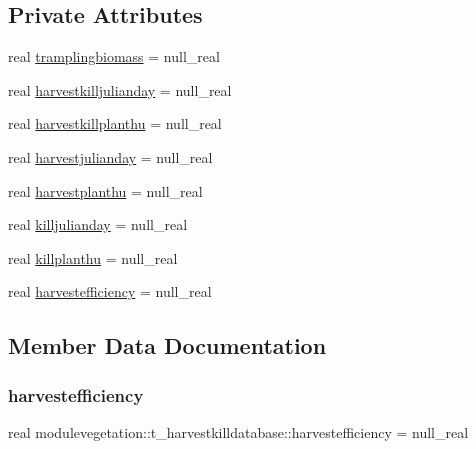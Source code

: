 \subsection*{Private Attributes}
\begin{DoxyCompactItemize}
\item 
real \mbox{\hyperlink{structmodulevegetation_1_1t__harvestkilldatabase_a9d1b143bd382f914e16085cb9b2c71a0}{tramplingbiomass}} = null\+\_\+real
\item 
real \mbox{\hyperlink{structmodulevegetation_1_1t__harvestkilldatabase_a53435b5ee72ab25499a4ff2b848b3c24}{harvestkilljulianday}} = null\+\_\+real
\item 
real \mbox{\hyperlink{structmodulevegetation_1_1t__harvestkilldatabase_acd6c508370d75e880af50c854e3a6689}{harvestkillplanthu}} = null\+\_\+real
\item 
real \mbox{\hyperlink{structmodulevegetation_1_1t__harvestkilldatabase_a51dd3243ff8f6e8a0f55bc804a05880c}{harvestjulianday}} = null\+\_\+real
\item 
real \mbox{\hyperlink{structmodulevegetation_1_1t__harvestkilldatabase_a0bdf28134107ac7d5887994ca64e4b3e}{harvestplanthu}} = null\+\_\+real
\item 
real \mbox{\hyperlink{structmodulevegetation_1_1t__harvestkilldatabase_a66f44948fd9ed832c18b597161de24d4}{killjulianday}} = null\+\_\+real
\item 
real \mbox{\hyperlink{structmodulevegetation_1_1t__harvestkilldatabase_ad4cd8e57dc60af57c3b5218e15d30a9d}{killplanthu}} = null\+\_\+real
\item 
real \mbox{\hyperlink{structmodulevegetation_1_1t__harvestkilldatabase_aa739c21df421022c892cf13586f0ecc8}{harvestefficiency}} = null\+\_\+real
\end{DoxyCompactItemize}


\subsection{Member Data Documentation}
\mbox{\label{structmodulevegetation_1_1t__harvestkilldatabase_aa739c21df421022c892cf13586f0ecc8}} 
\subsubsection{\texorpdfstring{harvestefficiency}{harvestefficiency}}
{\footnotesize\ttfamily real modulevegetation\+::t\+\_\+harvestkilldatabase\+::harvestefficiency = null\+\_\+real\hspace{0.3cm}{\ttfamily [private]}}

